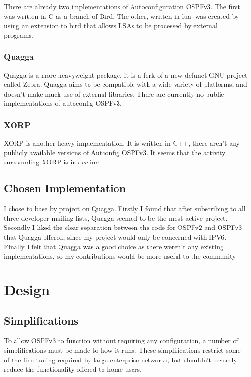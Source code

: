 \documentclass[12pt]{report}
\begin{document}
There are already two implementations of Autoconfiguration OSPFv3. The first
was written in C as a branch of Bird. The other, written in lua, was created by
using an extension to bird that allows LSAs to be processed by external
programs.

\subsection{Quagga}
Quagga is a more heavyweight package, it is a fork of a now defunct GNU project
called Zebra. Quagga aims to be compatible with a wide variety of platforms,
and doesn't make much use of external libraries. There are currently no public
implementations of autoconfig OSPFv3.

\subsection{XORP}
XORP is another heavy implementation. It is written in C++, there aren't any
publicly available versions of Autconfig OSPFv3. It seems that the activity
surrounding XORP is in decline. 

\section{Chosen Implementation}
I chose to base by project on Quagga. Firstly I found that after subscribing to
all three developer mailing lists, Quagga seemed to be the most active project.
Secondly I liked the clear separation between the code for OSPFv2 and OSPFv3
that Quagga offered, since my project would only be concerned with IPV6.
Finally I felt that Quagga was a good choice as there weren't any existing
implementations, so my contributions would be more useful to the community.

\chapter{Design}

\section{Simplifications}
To allow OSPFv3 to function without requiring any configuration, a number of
simplifications must be made to how it runs. These simplifications restrict
some of the fine tuning required by large enterprise networks, but shouldn't
severely reduce the functionality offered to home users. 
\end{document}
